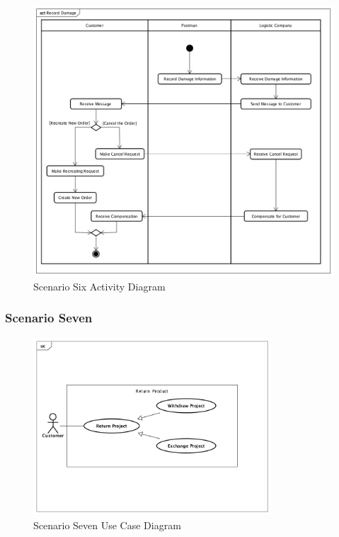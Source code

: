 \documentclass[12pt]{scrreprt}
\begin{document}
\begin{figure}[H]
  \centering\includegraphics[width=6in]{DocumentRes/6RecordDamage.png}
  \caption{Scenario Six Activity Diagram}
\end{figure}

\subsubsection{Scenario Seven}
\begin{figure}[H]
  \centering\includegraphics[width=3.5in]{DocumentRes/7UseCaseDiagram.png}
  \caption{Scenario Seven Use Case Diagram}
\end{figure}
\end{document}
